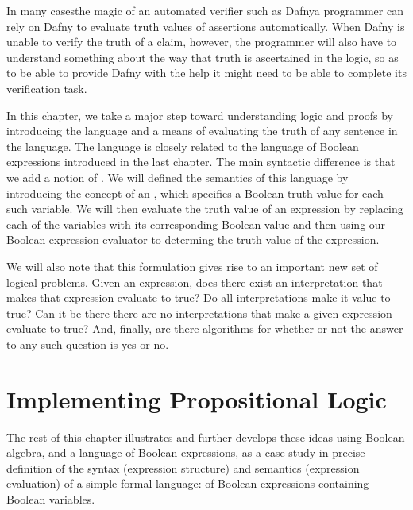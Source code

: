 \documentclass[letterpaper,10pt,english]{sphinxmanual}
\begin{document}
In many cases\textendash{}the magic of an automated verifier such as Dafny\textendash{}a
programmer can rely on Dafny to evaluate truth values of assertions
automatically. When Dafny is unable to verify the truth of a claim,
however, the programmer will also have to understand something about
the way that truth is ascertained in the logic, so as to be able to
provide Dafny with the help it might need to be able to complete its
verification task.

In this chapter, we take a major step toward understanding logic and
proofs by introducing the language  and a means
of evaluating the truth of any sentence in the language. The language
is closely related to the language of Boolean expressions introduced
in the last chapter. The main syntactic difference is that we add a
notion of . We will defined the semantics of
this language by introducing the concept of an , which
specifies a Boolean truth value for each such variable. We will then
evaluate the truth value of an expression  by replacing each of the
variables with its corresponding Boolean value and then using our
Boolean expression evaluator to determing the truth value of the
expression.

We will also note that this formulation gives rise to an important new
set of logical problems. Given an expression, does there exist an
interpretation that makes that expression evaluate to true? Do all
interpretations make it value to true? Can it be there there are no
interpretations that make a given expression evaluate to true?  And,
finally, are there  algorithms for  whether or
not the answer to any such question is yes or no.


\section{Implementing Propositional Logic}
\label{\detokenize{09-propositional-logic:implementing-propositional-logic}}
The rest of this chapter illustrates and further develops these ideas
using Boolean algebra, and a language of Boolean expressions, as a
case study in precise definition of the syntax (expression structure)
and semantics (expression evaluation) of a simple formal language: of
Boolean expressions containing Boolean variables.
\end{document}
